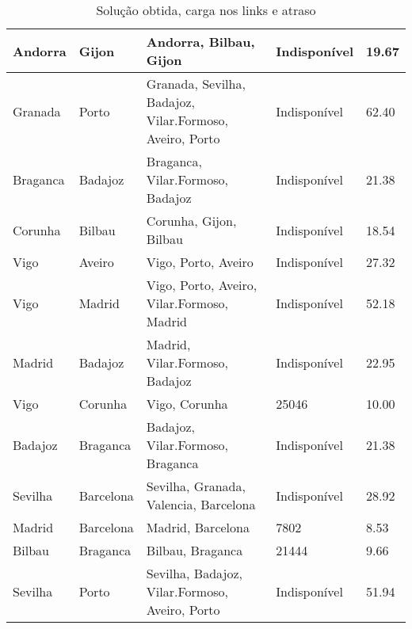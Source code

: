 \begin{table}[!htb]
{\begin{tabular}{|l|l|l|l|l|}
Andorra & Gijon & Andorra, Bilbau, Gijon & Indisponível & 19.67 \\ \hline
Granada & Porto & Granada, Sevilha, Badajoz, Vilar.Formoso, Aveiro, Porto & Indisponível & 62.40 \\ \hline
Braganca & Badajoz & Braganca, Vilar.Formoso, Badajoz & Indisponível & 21.38 \\ \hline
Corunha & Bilbau & Corunha, Gijon, Bilbau & Indisponível & 18.54 \\ \hline
Vigo & Aveiro & Vigo, Porto, Aveiro & Indisponível & 27.32 \\ \hline
Vigo & Madrid & Vigo, Porto, Aveiro, Vilar.Formoso, Madrid & Indisponível & 52.18 \\ \hline
Madrid & Badajoz & Madrid, Vilar.Formoso, Badajoz & Indisponível & 22.95 \\ \hline
Vigo & Corunha & Vigo, Corunha & 25046 & 10.00 \\ \hline
Badajoz & Braganca & Badajoz, Vilar.Formoso, Braganca & Indisponível & 21.38 \\ \hline
Sevilha & Barcelona & Sevilha, Granada, Valencia, Barcelona & Indisponível & 28.92 \\ \hline
Madrid & Barcelona & Madrid, Barcelona & 7802 & 8.53 \\ \hline
Bilbau & Braganca & Bilbau, Braganca & 21444 & 9.66 \\ \hline
Sevilha & Porto & Sevilha, Badajoz, Vilar.Formoso, Aveiro, Porto & Indisponível & 51.94 \\ \hline
\end{tabular}}
\caption[]{Solução obtida, carga nos links e atraso}
\end{table}

